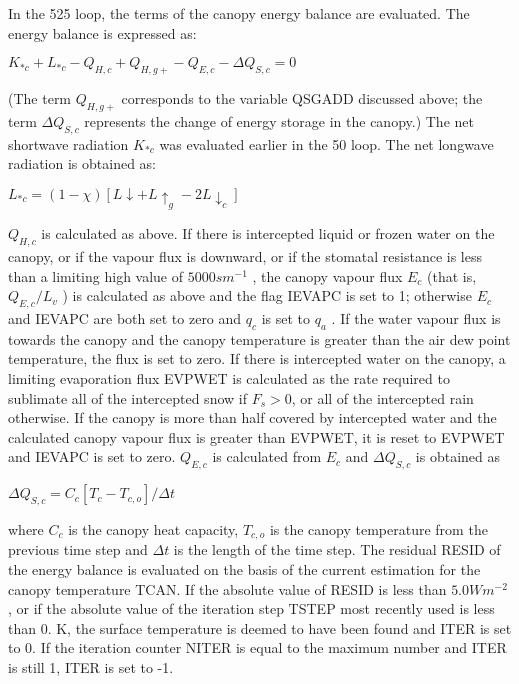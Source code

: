 In the 525 loop, the terms of the canopy energy balance are evaluated. The energy balance is expressed as\+:

$K_{*c} + L_{*c} - Q_{H,c} + Q_{H,g+} - Q_{E,c} - \Delta Q_{S,c} = 0$

(The term $Q_{H,g+}$ corresponds to the variable Q\+S\+G\+A\+D\+D discussed above; the term $\Delta Q_{S,c}$ represents the change of energy storage in the canopy.) The net shortwave radiation $K_{*c}$ was evaluated earlier in the 50 loop. The net longwave radiation is obtained as\+:

$L_{*c} = (1 - \chi) [L \downarrow + L \uparrow_g - 2 L \downarrow_c ]$

$Q_{H,c}$ is calculated as above. If there is intercepted liquid or frozen water on the canopy, or if the vapour flux is downward, or if the stomatal resistance is less than a limiting high value of $5000 s m^{-1}$ , the canopy vapour flux $E_c$ (that is, $Q_{E,c} /L_v$ ) is calculated as above and the flag I\+E\+V\+A\+P\+C is set to 1; otherwise $E_c$ and I\+E\+V\+A\+P\+C are both set to zero and $q_c$ is set to $q_a$ . If the water vapour flux is towards the canopy and the canopy temperature is greater than the air dew point temperature, the flux is set to zero. If there is intercepted water on the canopy, a limiting evaporation flux E\+V\+P\+W\+E\+T is calculated as the rate required to sublimate all of the intercepted snow if $F_s > 0$, or all of the intercepted rain otherwise. If the canopy is more than half covered by intercepted water and the calculated canopy vapour flux is greater than E\+V\+P\+W\+E\+T, it is reset to E\+V\+P\+W\+E\+T and I\+E\+V\+A\+P\+C is set to zero. $Q_{E,c}$ is calculated from $E_c$ and $\Delta Q_{S,c}$ is obtained as

$\Delta Q_{S,c} = C_c [T_c - T_{c,o} ]/ \Delta t$

where $C_c$ is the canopy heat capacity, $T_{c,o}$ is the canopy temperature from the previous time step and $\Delta t$ is the length of the time step. The residual R\+E\+S\+I\+D of the energy balance is evaluated on the basis of the current estimation for the canopy temperature T\+C\+A\+N. If the absolute value of R\+E\+S\+I\+D is less than $5.0 W m^{-2}$ , or if the absolute value of the iteration step T\+S\+T\+E\+P most recently used is less than 0. K, the surface temperature is deemed to have been found and I\+T\+E\+R is set to 0. If the iteration counter N\+I\+T\+E\+R is equal to the maximum number and I\+T\+E\+R is still 1, I\+T\+E\+R is set to -\/1.

